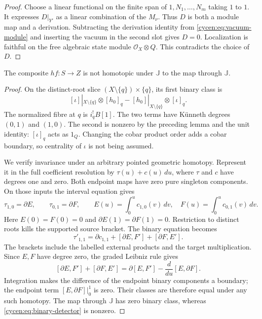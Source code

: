 \begin{proof}
Choose a linear functional on the finite span of
$1,N_1,\ldots,N_m$ taking $1$ to $1$.
It expresses $D|_{Y'}$ as a linear combination of
the $M_\nu$. Thus $D$ is both a module map and a
derivation. Subtracting the derivation identity
from \eqref{cycen:eq:vacuum-module} and inserting
the vacuum in the second slot gives $D=0$.
Localization is faithful on the free algebraic
state module $\mathcal O_X\otimes Q$. This
contradicts the choice of $D$.
\end{proof}

\begin{lemma}\label{cycen:lem:binary-invariant}
The composite $hf:S\to Z$ is not homotopic under
$\mathbb J$ to the map through $\mathbb J$.
\end{lemma}
\begin{proof}
On the distinct-root slice
$(X\setminus\{q\})\times\{q\}$, its first binary class is
\begin{equation}\label{cycen:eq:binary-detector}
 [\iota]|_{X\setminus\{q\}}\otimes[h_0]_q
       -[h_0]|_{X\setminus\{q\}}\otimes[\iota]_q.
\end{equation}
The normalized fibre at $q$ is $i_q^!B[1]$.
The two terms have K\"unneth degrees $(0,1)$ and
$(1,0)$. The second is nonzero by the preceding
lemma and the unit identity: $[\iota]_q$ acts as
$1_Q$. Changing the cobar product order adds a
cobar boundary, so centrality of $\iota$ is not
being assumed.

We verify invariance under an arbitrary pointed
geometric homotopy. Represent it in the full
coefficient resolution by $\tau(u)+c(u)\,du$,
where $\tau$ and $c$ have degrees one and zero.
Both endpoint maps have zero pure singleton
components. On those inputs the interval equation
gives
\[
 \tau_{1,0}=\partial E,\qquad
 \tau_{0,1}=\partial F,\qquad
 E(u)=\int_0^u c_{1,0}(v)\,dv,\quad
 F(u)=\int_0^u c_{0,1}(v)\,dv.
\]
Here $E(0)=F(0)=0$ and
$\partial E(1)=\partial F(1)=0$.
Restriction to distinct roots kills the supported
source bracket. The binary equation becomes
\[
 \tau'_{1,1}=\partial c_{1,1}
                   +[\partial E,F']+[\partial F,E'].
\]
The brackets include the labelled external
products and the target multiplication. Since
$E,F$ have degree zero, the graded Leibniz rule gives
\[
 [\partial E,F']+[\partial F,E']
   =\partial[E,F']-\frac{d}{du}[E,\partial F].
\]
Integration makes the difference of the endpoint
binary components a boundary; the endpoint term
$[E,\partial F]|_0^1$ is zero. Their classes are
therefore equal under any such homotopy.
The map through $\mathbb J$ has zero binary class,
whereas \eqref{cycen:eq:binary-detector} is nonzero.
\end{proof}

